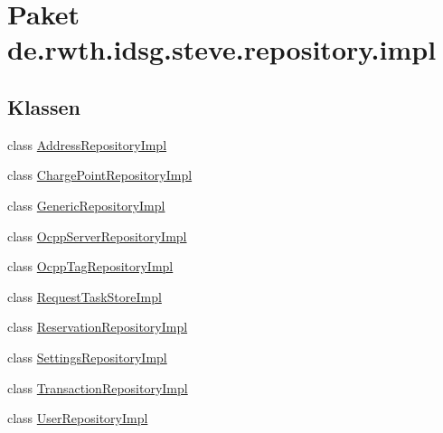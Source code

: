 \hypertarget{namespacede_1_1rwth_1_1idsg_1_1steve_1_1repository_1_1impl}{\section{Paket de.\-rwth.\-idsg.\-steve.\-repository.\-impl}
\label{namespacede_1_1rwth_1_1idsg_1_1steve_1_1repository_1_1impl}
}
\subsection*{Klassen}
\begin{DoxyCompactItemize}
\item 
class \hyperlink{classde_1_1rwth_1_1idsg_1_1steve_1_1repository_1_1impl_1_1_address_repository_impl}{Address\-Repository\-Impl}
\item 
class \hyperlink{classde_1_1rwth_1_1idsg_1_1steve_1_1repository_1_1impl_1_1_charge_point_repository_impl}{Charge\-Point\-Repository\-Impl}
\item 
class \hyperlink{classde_1_1rwth_1_1idsg_1_1steve_1_1repository_1_1impl_1_1_generic_repository_impl}{Generic\-Repository\-Impl}
\item 
class \hyperlink{classde_1_1rwth_1_1idsg_1_1steve_1_1repository_1_1impl_1_1_ocpp_server_repository_impl}{Ocpp\-Server\-Repository\-Impl}
\item 
class \hyperlink{classde_1_1rwth_1_1idsg_1_1steve_1_1repository_1_1impl_1_1_ocpp_tag_repository_impl}{Ocpp\-Tag\-Repository\-Impl}
\item 
class \hyperlink{classde_1_1rwth_1_1idsg_1_1steve_1_1repository_1_1impl_1_1_request_task_store_impl}{Request\-Task\-Store\-Impl}
\item 
class \hyperlink{classde_1_1rwth_1_1idsg_1_1steve_1_1repository_1_1impl_1_1_reservation_repository_impl}{Reservation\-Repository\-Impl}
\item 
class \hyperlink{classde_1_1rwth_1_1idsg_1_1steve_1_1repository_1_1impl_1_1_settings_repository_impl}{Settings\-Repository\-Impl}
\item 
class \hyperlink{classde_1_1rwth_1_1idsg_1_1steve_1_1repository_1_1impl_1_1_transaction_repository_impl}{Transaction\-Repository\-Impl}
\item 
class \hyperlink{classde_1_1rwth_1_1idsg_1_1steve_1_1repository_1_1impl_1_1_user_repository_impl}{User\-Repository\-Impl}
\end{DoxyCompactItemize}
